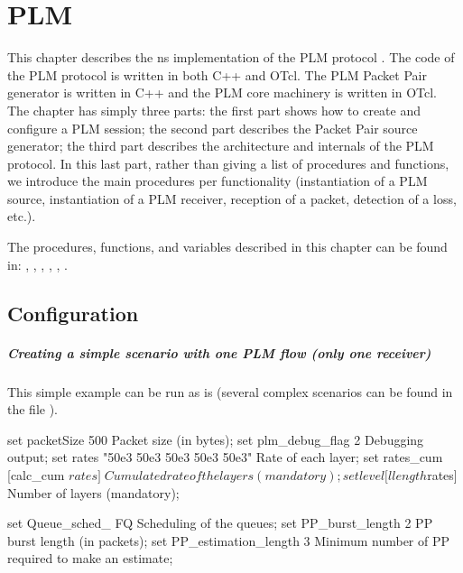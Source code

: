 \chapter{PLM}
{\sloppy
\label{sec:PLM}
This chapter describes the ns  implementation of the PLM protocol
\cite{legout_sigmetrics2000}. The code of the PLM 
protocol  is written in both C++ and OTcl. The PLM Packet Pair generator is
written in C++ and the PLM core machinery is written in OTcl. The chapter has simply
three parts: the first part shows how to create and configure a PLM session; the
second part describes the Packet Pair source generator; the third part describes
the architecture and internals of the PLM protocol. In this last part, rather
than giving a list of procedures and functions, we introduce the main
procedures per functionality (instantiation of a PLM source, instantiation of a
PLM receiver, reception of a packet, detection of a loss, etc.).

The procedures, functions, and variables described in this chapter can be found in:
, , ,
, , .

\section{Configuration}
\label{sec:Configuration}
\paragraph{Creating a simple scenario with one PLM flow (only one receiver)\\}
This simple example can be run as is (several complex scenarios can be found in
the file ).

\begin{program}
  set packetSize 500                          \;Packet size (in bytes);
  set plm_debug_flag 2                        \;Debugging output;
  set rates "50e3 50e3 50e3 50e3 50e3"        \;Rate of each layer;
  set rates_cum [calc_cum $rates]       \;Cumulated rate of the layers (mandatory);
  set level [llength $rates]            \;Number of layers (mandatory);
  
  set Queue_sched_ FQ                         \;Scheduling of the queues;
  set PP_burst_length 2                       \;PP burst length (in packets);
  set PP_estimation_length 3                  \;Minimum number of PP required to make an estimate;


\end{program}}
